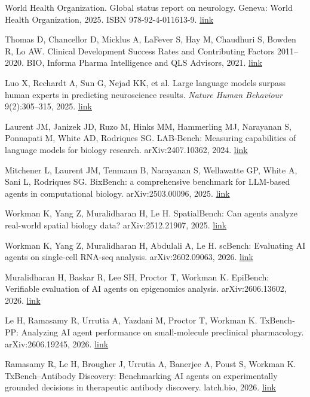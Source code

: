\begin{references}
\item World Health Organization. Global status report on neurology. Geneva: World Health Organization, 2025. ISBN 978-92-4-011613-9. \href{https://www.who.int/publications/i/item/9789240116139}{link}
\item Thomas D, Chancellor D, Micklus A, LaFever S, Hay M, Chaudhuri S, Bowden R, Lo AW. Clinical Development Success Rates and Contributing Factors 2011--2020. BIO, Informa Pharma Intelligence and QLS Advisors, 2021. \href{https://www.bio.org/clinical-development-success-rates-and-contributing-factors-2011-2020}{link}
\item Luo X, Rechardt A, Sun G, Nejad KK, et al. Large language models surpass human experts in predicting neuroscience results. \textit{Nature Human Behaviour} 9(2):305--315, 2025. \href{https://doi.org/10.1038/s41562-024-02046-9}{link}
\item Laurent JM, Janizek JD, Ruzo M, Hinks MM, Hammerling MJ, Narayanan S, Ponnapati M, White AD, Rodriques SG. LAB-Bench: Measuring capabilities of language models for biology research. arXiv:2407.10362, 2024. \href{https://arxiv.org/abs/2407.10362}{link}
\item Mitchener L, Laurent JM, Tenmann B, Narayanan S, Wellawatte GP, White A, Sani L, Rodriques SG. BixBench: a comprehensive benchmark for LLM-based agents in computational biology. arXiv:2503.00096, 2025. \href{https://arxiv.org/abs/2503.00096}{link}
\item Workman K, Yang Z, Muralidharan H, Le H. SpatialBench: Can agents analyze real-world spatial biology data? arXiv:2512.21907, 2025. \href{https://arxiv.org/abs/2512.21907}{link}
\item Workman K, Yang Z, Muralidharan H, Abdulali A, Le H. scBench: Evaluating AI agents on single-cell RNA-seq analysis. arXiv:2602.09063, 2026. \href{https://arxiv.org/abs/2602.09063}{link}
\item Muralidharan H, Baskar R, Lee SH, Proctor T, Workman K. EpiBench: Verifiable evaluation of AI agents on epigenomics analysis. arXiv:2606.13602, 2026. \href{https://arxiv.org/abs/2606.13602}{link}
\item Le H, Ramasamy R, Urrutia A, Yazdani M, Proctor T, Workman K. TxBench-PP: Analyzing AI agent performance on small-molecule preclinical pharmacology. arXiv:2606.19245, 2026. \href{https://arxiv.org/abs/2606.19245}{link}
\item Ramasamy R, Le H, Brougher J, Urrutia A, Banerjee A, Poust S, Workman K. TxBench--Antibody Discovery: Benchmarking AI agents on experimentally grounded decisions in therapeutic antibody discovery. latch.bio, 2026. \href{https://latch.bio/txbench-ab}{link}

\end{references}
